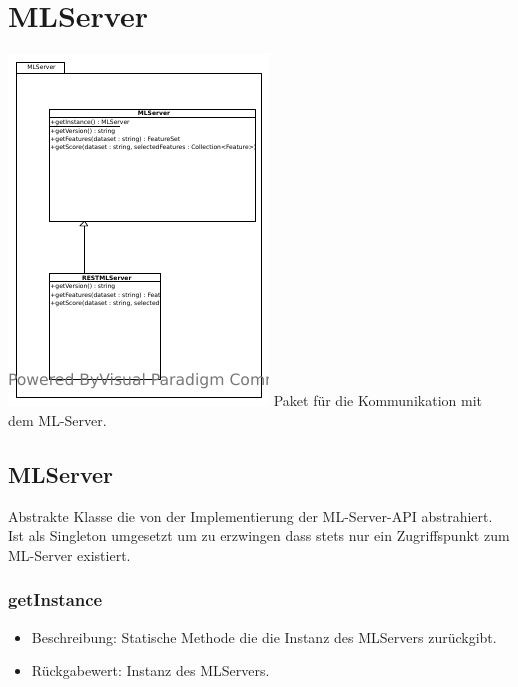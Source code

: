 \documentclass[a4paper]{scrreprt}
\begin{document}
	\section{MLServer}
	\includegraphics[width=\textwidth]{img/package/MLServer.pdf}
	Paket für die Kommunikation mit dem ML-Server.

	\subsection{MLServer}
	Abstrakte Klasse die von der Implementierung der ML-Server-API abstrahiert.
	Ist als Singleton umgesetzt um zu erzwingen dass stets nur ein Zugriffspunkt zum ML-Server existiert.

	\subsubsection{getInstance}
	\begin{itemize}
		\item Beschreibung: Statische Methode die die Instanz des MLServers zurückgibt.
		\item Rückgabewert: Instanz des MLServers.
	\end{itemize}
\end{document}
